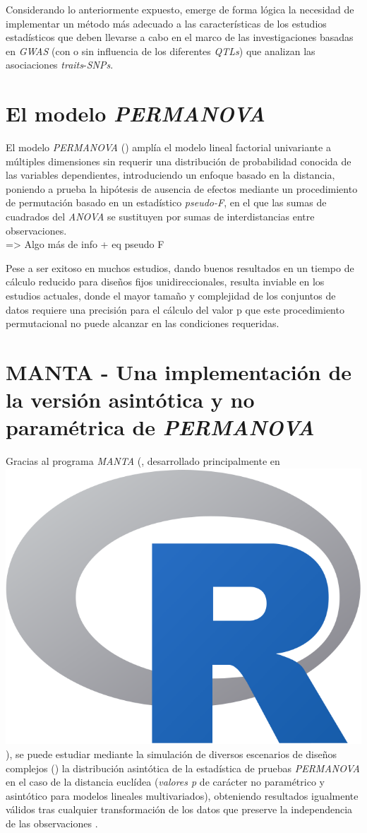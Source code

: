 \documentclass[IB,BIB]{TFUOC}%
\newcommand{\myequations}[1]{
\refstepcounter{myequations}%
\par\noindent\textbf{Equation \themyequations. 1}
\addcontentsline{equ}{myequations}{\protect\numberline{\thechapter.\themyequations}1}\par}
\newcommand{\Rlogo}{\protect\includegraphics[height=2.5ex,keepaspectratio]{Rlogo.png}}
\begin{document}
Considerando lo anteriormente expuesto, emerge de forma lógica la necesidad de implementar un método más adecuado a las características de los estudios estadísticos que deben llevarse a cabo en el marco de las investigaciones basadas en \textit{GWAS} (con o sin influencia de los diferentes \textit{QTLs}) que analizan las asociaciones \textit{traits}-\textit{SNPs}.


\section{El modelo \textit{PERMANOVA}}
\label{sec:El modelo PERMANOVA}

El modelo \textit{PERMANOVA} (\cite{anderson_new_2001}) amplía el modelo lineal factorial univariante a múltiples dimensiones sin requerir una distribución de probabilidad conocida de las variables dependientes, introduciendo un enfoque basado en la distancia, poniendo a prueba la hipótesis de ausencia de efectos mediante un procedimiento de permutación basado en un estadístico \textit{\gls{pseudo-F}}, en el que las sumas de cuadrados del \textit{ANOVA} se sustituyen por sumas de interdistancias entre observaciones.\\

=> Algo más de info + eq pseudo F

% 

Pese a ser exitoso en muchos estudios, dando buenos resultados en un tiempo de cálculo reducido para diseños fijos unidireccionales, resulta inviable en los estudios actuales, donde el mayor tamaño y complejidad de los conjuntos de datos requiere una precisión para el cálculo del valor p que este procedimiento permutacional no puede alcanzar en las condiciones requeridas.


\section{MANTA - Una implementación de la versión asintótica y no paramétrica de \textit{PERMANOVA}}
\label{sec:MANTA - Una implementación de la versión asintótica y no paramétrica de PERMANOVA}

Gracias al programa \textit{\gls{MANTA}} (\cite{garrido-martin_manta_2023}, desarrollado principalmente en \hspace{-.2em}\Rlogo\hspace{+.1em}), se puede estudiar mediante la simulación de diversos escenarios de diseños complejos (\cite{garrido-martin_manta-sim_2022}) la distribución asintótica de la estadística de pruebas \textit{PERMANOVA} en el caso de la distancia euclídea (\textit{\gls{valores p}} de carácter no paramétrico y asintótico para modelos lineales multivariados), obteniendo resultados igualmente válidos tras cualquier transformación de los datos que preserve la independencia de las observaciones \cite{garrido-martin_fast_2022, garrido-martin_identification_2021, monlong_identification_2014}.
\end{document}
